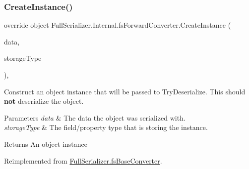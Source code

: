 \mbox{\label{class_full_serializer_1_1_internal_1_1fs_forward_converter_ac060a50ae6f3241ea0f9465e1d261d12}} 
\subsubsection{\texorpdfstring{Create\+Instance()}{CreateInstance()}}
{\footnotesize\ttfamily override object Full\+Serializer.\+Internal.\+fs\+Forward\+Converter.\+Create\+Instance (\begin{DoxyParamCaption}\item[{\hyperlink{class_full_serializer_1_1fs_data}{fs\+Data}}]{data,  }\item[{Type}]{storage\+Type }\end{DoxyParamCaption})\hspace{0.3cm}{\ttfamily [inline]}, {\ttfamily [virtual]}}



Construct an object instance that will be passed to Try\+Deserialize. This should {\bfseries not} deserialize the object. 


\begin{DoxyParams}{Parameters}
{\em data} & The data the object was serialized with.\\
\hline
{\em storage\+Type} & The field/property type that is storing the instance.\\
\hline
\end{DoxyParams}
\begin{DoxyReturn}{Returns}
An object instance
\end{DoxyReturn}


Reimplemented from \hyperlink{class_full_serializer_1_1fs_base_converter_a415ea2ac9429bbb9927346af7cb7c2e1}{Full\+Serializer.\+fs\+Base\+Converter}.

\mbox{\label{class_full_serializer_1_1_internal_1_1fs_forward_converter_a81d2d460112d57d67e8156cd5a52e1e1}} 
